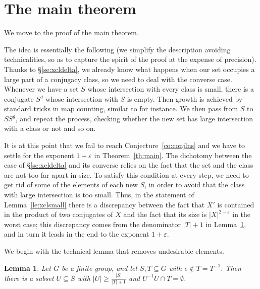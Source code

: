 \documentclass[a4paper]{article}
\newtheorem{lemma}[proposition]{Lemma}
\theoremstyle{definition}
\numberwithin{equation}{section}
\begin{document}
\section{The main theorem}\label{se:main}

We move to the proof of the main theorem.

The idea is essentially the following (we simplify the description avoiding technicalities, so as to capture the spirit of the proof at the expense of precision). Thanks to \S\ref{se:xcldelta}, we already know what happens when our set occupies a large part of a conjugacy class, so we need to deal with the converse case. Whenever we have a set $S$ whose intersection with every class is small, there is a conjugate $S^{g}$ whose intersection with $S$ is empty. Then growth is achieved by standard tricks in map counting, similar to \cite[Lemma 2.2]{Hel19b} for instance. We then pass from $S$ to $SS^{g}$, and repeat the process, checking whether the new set has large intersection with a class or not and so on.

It is at this point that we fail to reach Conjecture~\ref{co:conjlns} and we have to settle for the exponent $1+\varepsilon$ in Theorem~\ref{th:main}. The dichotomy between the case of \S\ref{se:xcldelta} and its converse relies on the fact that the set and the class are not too far apart in size. To satisfy this condition at every step, we need to get rid of some of the elements of each new $S$, in order to avoid that the class with large intersection is too small. Thus, in the statement of Lemma~\ref{le:xclsmall} there is a discrepancy between the fact that $X'$ is contained in the product of two conjugates of $X$ and the fact that its size is $|X|^{2-\varepsilon}$ in the worst case; this discrepancy comes from the denominator $|T|+1$ in Lemma~\ref{le:cutsmall}, and in turn it leads in the end to the exponent $1+\varepsilon$.

We begin with the technical lemma that removes undesirable elements.

\begin{lemma}\label{le:cutsmall}
Let $G$ be a finite group, and let $S,T\subseteq G$ with $e\notin T=T^{-1}$. Then there is a subset $U\subseteq S$ with $|U|\geq\frac{|S|}{|T|+1}$ and $U^{-1}U\cap T=\emptyset$.
\end{lemma}
\end{document}
